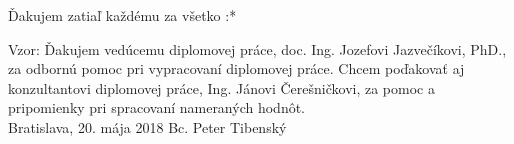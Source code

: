 \null
\vfill
\noindent
Ďakujem zatiaľ každému za všetko :* 

Vzor: Ďakujem vedúcemu diplomovej práce, doc. Ing. Jozefovi Jazvečíkovi, PhD., za odbornú pomoc pri vypracovaní diplomovej práce. Chcem poďakovať aj konzultantovi diplomovej práce, Ing. Jánovi Čerešničkovi, za pomoc a pripomienky pri spracovaní nameraných hodnôt.\\

\noindent Bratislava, 20. mája 2018 \hfill Bc. Peter Tibenský
\cleardoublepage


	

